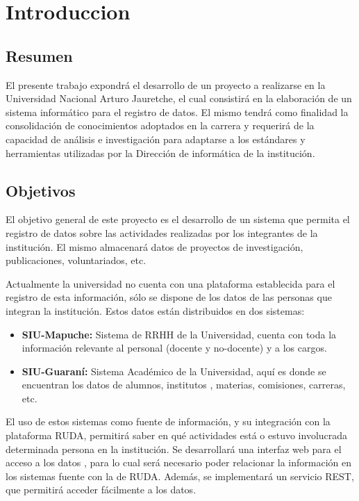 
\section{Introduccion}%
\label{sec:introduccion}

\subsection{Resumen}%
\label{sub:resumen}

El presente trabajo expondrá el desarrollo de un proyecto a realizarse en la Universidad Nacional Arturo Jauretche, el cual
consistirá en la elaboración de un sistema informático para el registro de datos\@. El mismo tendrá como finalidad la consolidación
de conocimientos adoptados en la carrera y requerirá de la capacidad de análisis e investigación para adaptarse a los estándares
y herramientas utilizadas por la Dirección de informática de la institución.

\subsection{Objetivos}%
\label{sub:objetivos}


El objetivo general de este proyecto es el desarrollo de un sistema que permita el registro de datos sobre las actividades
realizadas por los integrantes de la institución. El mismo almacenará datos de proyectos de investigación, publicaciones, voluntariados, etc.

Actualmente la universidad no cuenta con una plataforma establecida para el registro de esta información, sólo se dispone de
los datos de las personas que integran la institución. Estos datos están distribuidos en dos sistemas:
\begin{itemize}
    \item \textbf{SIU-Mapuche:} Sistema de RRHH de la Universidad, cuenta con toda la información relevante al personal (docente
        y no-docente) y a los cargos.
    \item \textbf{SIU-Guaraní:} Sistema Académico de la Universidad, aquí es donde se encuentran los datos de alumnos, institutos
        , materias, comisiones, carreras, etc.
\end{itemize}

El uso de estos sistemas como fuente de información, y su integración con la plataforma RUDA, permitirá saber en qué actividades
está o estuvo involucrada determinada persona en la institución. Se desarrollará una interfaz web para el acceso a los datos
, para lo cual será necesario poder relacionar la información en los sistemas fuente con la de RUDA\@. Además, se implementará
un servicio REST, que permitirá acceder fácilmente a los datos.

